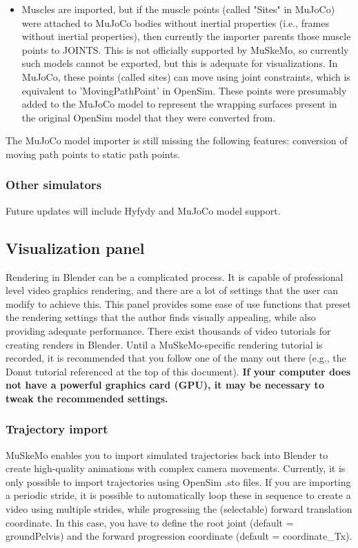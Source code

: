 \documentclass{article}
\begin{document}
\begin{itemize}
\item Muscles are imported, but if the muscle points (called "Sites" in MuJoCo) were attached to MuJoCo bodies without inertial properties (i.e., frames without inertial properties), then currently the importer parents those muscle points to JOINTS. This is not officially supported by MuSkeMo, so currently such models cannot be exported, but this is adequate for visualizations. In MuJoCo, these points (called sites) can move using joint constraints, which is equivalent to 'MovingPathPoint' in OpenSim. These points were presumably added to the MuJoCo model to represent the wrapping surfaces present in the original OpenSim model that they were converted from.


\end{itemize}

The MuJoCo model importer is still missing the following features: conversion of moving path points to static path points.

\subsubsection{Other simulators}

Future updates will include Hyfydy and MuJoCo model support.


\subsection{Visualization panel}
\label{sec:visualizationpanel}
Rendering in Blender can be a complicated process. It is capable of professional level video graphics rendering, and there are a lot of settings that the user can modify to achieve this. This panel provides some ease of use functions that preset the rendering settings that the author finds visually appealing, while also providing adequate performance. There exist thousands of video tutorials for creating renders in Blender. Until a MuSkeMo-specific rendering tutorial is recorded, it is recommended that you follow one of the many out there (e.g., the Donut tutorial referenced at the top of this document). \textbf{If your computer does not have a powerful graphics card (GPU), it may be necessary to tweak the recommended settings.} 


\subsubsection{Trajectory import}
\label{sec:trajectoryimport}
MuSkeMo enables you to import simulated trajectories back into Blender to create high-quality animations with complex camera movements. Currently, it is only possible to import trajectories using OpenSim .sto files. If you are importing a periodic stride, it is possible to automatically loop these in sequence to create a video using multiple strides, while progressing the (selectable) forward translation coordinate. In this case, you have to define the root joint (default =  groundPelvis) and the forward progression coordinate (default = coordinate\_Tx).
\end{document}
